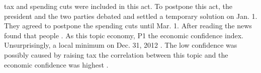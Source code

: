  tax  and spending cuts were included in this act.
To postpone this act, the president and the two  parties debated  and settled  a temporary solution on Jan. 1.
They agreed to postpone the spending cuts until Mar. 1.
After reading the news found that people .
As this topic   economy, P1  the economic confidence index.
Unsurprisingly, a local minimum on Dec. 31, 2012  .
The low confidence  was possibly caused by raising tax   the correlation between this topic and the economic confidence was  highest .

